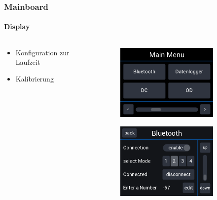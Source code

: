 \begin{frame}
	\frametitle{Mainboard}
	\framesubtitle{Display}
	
	\begin{columns}
		\begin{column}{0.3\textwidth}
			\begin{itemize}
				\item Konfiguration zur Laufzeit
				\item Kalibrierung
			\end{itemize}
		\end{column}
		\begin{column}{0.7\textwidth}
			\vspace{-1em}
			\begin{figure}
				\begin{subfigure}{0.4\textwidth}
					\includegraphics[width=\textwidth]{../images/displayMainMenu.png}
				\end{subfigure}
				\hspace{0.9em}
				\begin{subfigure}{0.4\textwidth}
					\includegraphics[width=\textwidth]{../images/displaySubMenu.png}
				\end{subfigure}
				

\end{figure}
\end{column}
\end{columns}
\end{frame}
